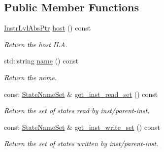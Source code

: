 \subsection*{Public Member Functions}
\begin{DoxyCompactItemize}
\item 
\mbox{\label{classilang_1_1_trace_step_abac6e1d81a83a513e89f8e5a7e0aa12d}} 
\mbox{\hyperlink{namespaceilang_ad1b30fdf347e493b3937143da05d1a72}{Instr\+Lvl\+Abs\+Ptr}} \mbox{\hyperlink{classilang_1_1_trace_step_abac6e1d81a83a513e89f8e5a7e0aa12d}{host}} () const
\begin{DoxyCompactList}\small\item\em Return the host I\+LA. \end{DoxyCompactList}\item 
\mbox{\label{classilang_1_1_trace_step_a38df7c1cd47ec7dc399b8ecb8dbaf2a7}} 
std\+::string \mbox{\hyperlink{classilang_1_1_trace_step_a38df7c1cd47ec7dc399b8ecb8dbaf2a7}{name}} () const
\begin{DoxyCompactList}\small\item\em Return the name. \end{DoxyCompactList}\item 
\mbox{\label{classilang_1_1_trace_step_a718de31ac8a6222b2640cbcd88a85421}} 
const \mbox{\hyperlink{classilang_1_1_trace_step_a784c4a30b16707ec6a2ed6e96e268c86}{State\+Name\+Set}} \& \mbox{\hyperlink{classilang_1_1_trace_step_a718de31ac8a6222b2640cbcd88a85421}{get\+\_\+inst\+\_\+read\+\_\+set}} () const
\begin{DoxyCompactList}\small\item\em Return the set of states read by inst/parent-\/inst. \end{DoxyCompactList}\item 
\mbox{\label{classilang_1_1_trace_step_a893542af9575911f5d68dbeb38a042fc}} 
const \mbox{\hyperlink{classilang_1_1_trace_step_a784c4a30b16707ec6a2ed6e96e268c86}{State\+Name\+Set}} \& \mbox{\hyperlink{classilang_1_1_trace_step_a893542af9575911f5d68dbeb38a042fc}{get\+\_\+inst\+\_\+write\+\_\+set}} () const
\begin{DoxyCompactList}\small\item\em Return the set of states written by inst/parent-\/inst. \end{DoxyCompactList}\item 

\end{DoxyCompactItemize}

